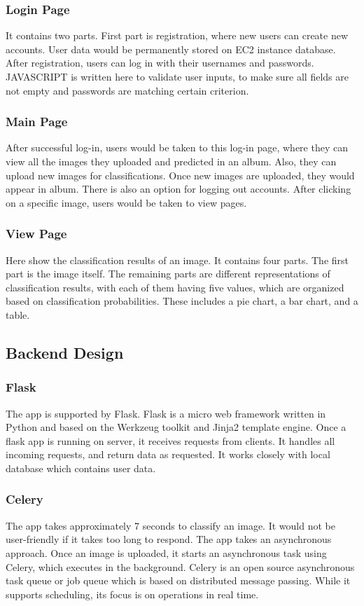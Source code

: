 \documentclass[conference]{IEEEtran}
\begin{document}
\subsubsection{Login Page}
It contains two parts. First part is registration, where new users can create new accounts. User data would be permanently stored on EC2 instance database. After registration, users can log in with their usernames and passwords. JAVASCRIPT is written here to validate user inputs, to make sure all fields are not empty and passwords are matching certain criterion.

\subsubsection{Main Page}
After successful log-in, users would be taken to this log-in page, where they can view all the images they uploaded and predicted in an album. Also, they can upload new images for classifications. Once new images are uploaded, they would appear in album. There is also an option for logging out accounts. After clicking on a specific image, users would be taken to view pages.

\subsubsection{View Page}
Here show the classification results of an image. It contains four parts. The first part is the image itself. The remaining parts are different representations of classification results, with each of them having five values, which are organized based on classification probabilities. These includes a pie chart, a bar chart, and a table.

\subsection{Backend Design}

\subsubsection{Flask}
The app is supported by Flask. Flask is a micro web framework written in Python and based on the Werkzeug toolkit and Jinja2 template engine.\cite{wiki:flask} Once a flask app is running on server, it receives requests from clients. It handles all incoming requests, and return data as requested. It works closely with local database which contains user data.

\subsubsection{Celery}
The app takes approximately 7 seconds to classify an image. It would not be user-friendly if it takes too long to respond. The app takes an asynchronous approach. Once an image is uploaded, it starts an asynchronous task using Celery, which executes in the background. Celery is an open source asynchronous task queue or job queue which is based on distributed message passing. While it supports scheduling, its focus is on operations in real time.\cite{wiki:celery}
\end{document}
